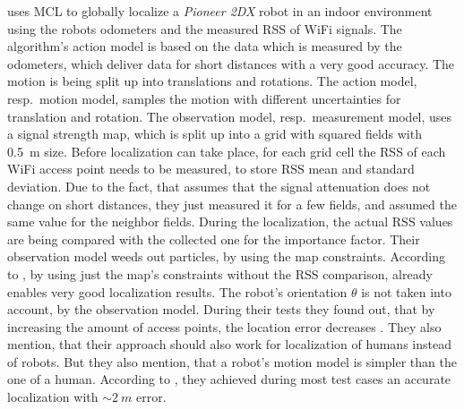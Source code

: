 \citep{siddiqi:experiments_mcl_wifi} uses \acs{MCL} to globally localize a \emph{Pioneer 2DX} robot in an indoor environment using the robots odometers and the measured \acs{RSS} of WiFi signals. The algorithm's action model is based on the data which is measured by the odometers, which deliver data for short distances with a very good accuracy. The motion is being split up into translations and rotations. The action model, resp.\ motion model, samples the motion with different uncertainties for translation and rotation. The observation model, resp.\ measurement model, uses a signal strength map, which is split up into a grid with squared fields with 0.5~m size. Before localization can take place, for each grid cell the \acs{RSS} of each WiFi access point needs to be measured, to store \acs{RSS} mean and standard deviation. Due to the fact, that \citet{siddiqi:experiments_mcl_wifi} assumes that the signal attenuation does not change on short distances, they just measured it for a few fields, and assumed the same value for the neighbor fields. During the localization, the actual \acs{RSS} values are being compared with the collected one for the importance factor. Their observation model weeds out particles, by using the map constraints. According to \citet{siddiqi:experiments_mcl_wifi}, by using just the map's constraints without the \acs{RSS} comparison, already enables very good localization results. The robot's orientation $\theta$ is not taken into account, by the observation model.
During their tests they found out, that by increasing the amount of access points, the location error decreases \citep{siddiqi:experiments_mcl_wifi}. They also mention, that their approach should also work for localization of humans instead of robots. But they also mention, that a robot's motion model is simpler than the one of a human. According to \citet{siddiqi:experiments_mcl_wifi}, they achieved during most test cases an accurate localization with $\sim 2~m$ error.


